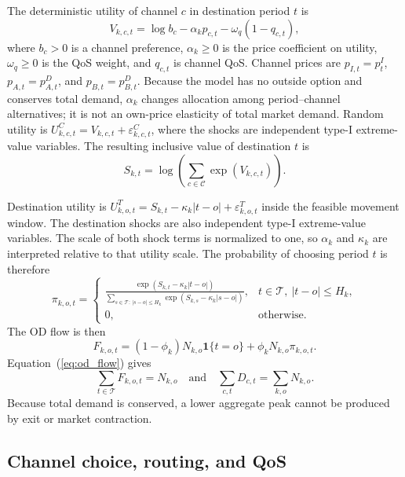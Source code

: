 \documentclass[11pt,a4paper]{article}
\newcommand{\T}{\mathcal{T}}
\newcommand{\Channels}{\mathcal{C}}
\begin{document}
The deterministic utility of channel $c$ in destination period $t$ is
\begin{equation}
V_{k,c,t}=\log b_c-\alpha_k p_{c,t}-\omega_q(1-q_{c,t}),
\label{eq:channel_utility}
\end{equation}
where $b_c>0$ is a channel preference, $\alpha_k\ge0$ is the price coefficient on utility, $\omega_q\ge0$ is the QoS weight, and $q_{c,t}$ is channel QoS. Channel prices are $p_{I,t}=p^I_t$, $p_{A,t}=p^D_{A,t}$, and $p_{B,t}=p^D_{B,t}$. Because the model has no outside option and conserves total demand, $\alpha_k$ changes allocation among period--channel alternatives; it is not an own-price elasticity of total market demand. Random utility is $U^C_{k,c,t}=V_{k,c,t}+\varepsilon^C_{k,c,t}$, where the shocks are independent type-I extreme-value variables. The resulting inclusive value of destination $t$ is
\begin{equation}
S_{k,t}=\log\left(\sum_{c\in\Channels}\exp(V_{k,c,t})\right).
\label{eq:destination_value}
\end{equation}

Destination utility is $U^T_{k,o,t}=S_{k,t}-\kappa_k|t-o|+\varepsilon^T_{k,o,t}$ inside the feasible movement window. The destination shocks are also independent type-I extreme-value variables. The scale of both shock terms is normalized to one, so $\alpha_k$ and $\kappa_k$ are interpreted relative to that utility scale. The probability of choosing period $t$ is therefore
\begin{equation}
\pi_{k,o,t}=
\begin{cases}
\displaystyle
\frac{\exp(S_{k,t}-\kappa_k|t-o|)}
{\sum_{s\in\T:\,|s-o|\le H_k}\exp(S_{k,s}-\kappa_k|s-o|)},
& t\in\T,\ |t-o|\le H_k,\\[7pt]
0, & \text{otherwise}.
\end{cases}
\label{eq:temporal_probability}
\end{equation}
The OD flow is then
\begin{equation}
F_{k,o,t}=(1-\phi_k)N_{k,o}\mathbf{1}\{t=o\}
+\phi_k N_{k,o}\pi_{k,o,t}.
\label{eq:od_flow}
\end{equation}
Equation~(\ref{eq:od_flow}) gives
\begin{equation}
\sum_{t\in\T}F_{k,o,t}=N_{k,o}
\quad\text{and}\quad
\sum_{c,t}D_{c,t}=\sum_{k,o}N_{k,o}.
\label{eq:mass_conservation}
\end{equation}
Because total demand is conserved, a lower aggregate peak cannot be produced by exit or market contraction.

\subsection{Channel choice, routing, and QoS}
\end{document}
